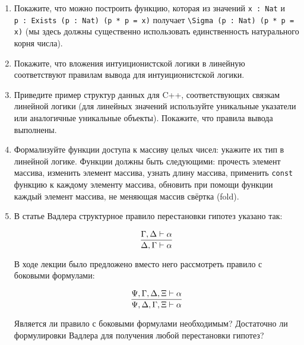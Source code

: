 \documentclass[10pt,a4paper,oneside]{article}
\begin{document}
\begin{enumerate}
\begin{enumerate}
\item Замените \verb!{?}! в тексте выше на корректное доказательство.
\item Определите функцию, которая бы по $x$ и значению $\exists p q.3 \cdot p + q = x \with 0 \le q < 3$ возвращала бы \verb!Div3 x!
(понятно, можно разделить $x$ на 3, но нам уже результат деления дали вторым аргументом --- задача в том, чтобы им воспользоваться).
\item Постройте аналогичный тип \verb!Prime x! для простых чисел --- с тремя вариантами \verb!less-than-two!, \verb!is-prime!, 
\verb!is-composite! --- и определите функцию, строящую по числу значение данного типа.
\item Покажите, что в типе \verb!Prime (x*x + 2*x + 1)! всегда (кроме граничных случаев) обитает вариант \verb!is-composite!.
\item Покажите, что в типе 
\begin{verbatim}
\data SuperDec (P : \Prop)
| sure P
| nope (P -> Empty)
| neither ((P || (P -> Empty)) -> Empty)
\where \use \level superDecProp {P : \Prop} (a b : SuperDec P): a = b => {?}
\end{verbatim}
вариант \verb!neither! невозможен (также, заполните пропущенное доказательство \verb!superDecProp!).
\end{enumerate}

\item Покажите, что можно построить функцию, которая из значений \verb!x : Nat! и\\\verb!p : Exists (p : Nat) (p * p = x)! получает
\verb!\Sigma (p : Nat) (p * p = x)! (мы здесь должны существенно использовать единственность натурального корня числа).
\item Покажите, что вложения интуиционистской логики в линейную соответствуют правилам вывода для интуиционистской логики.
\item Приведите пример структур данных для C++, соответствующих связкам линейной логики (для линейных значений используйте 
уникальные указатели или аналогичные уникальные объекты). Покажите, что правила вывода выполнены.
\item Формализуйте функции доступа к массиву целых чисел: укажите их тип в линейной логике. Функции должны быть следующими:
прочесть элемент массива, изменить элемент массива, узнать длину массива, применить \verb!const! функцию к каждому элементу
массива, обновить при помощи функции каждый элемент массива, не меняющая массив свёртка (fold).
\item В статье Вадлера структурное правило перестановки гипотез указано так:

$$\infer{\Delta,\Gamma\vdash\alpha}{\Gamma,\Delta\vdash\alpha}$$

В ходе лекции было предложено вместо него рассмотреть правило с боковыми формулами:

$$\infer{\Psi,\Delta,\Gamma,\Xi\vdash\alpha}{\Psi,\Gamma,\Delta,\Xi\vdash\alpha}$$

Является ли правило с боковыми формулами необходимым? Достаточно ли формулировки Вадлера для получения любой перестановки 
гипотез?

\end{enumerate}
\end{document}
